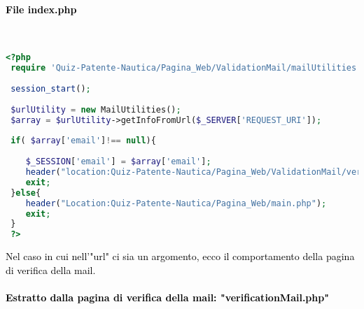 \paragraph{\textcolor{black}{File index.php}}\leavevmode\\
  
 \begin{lstlisting}[language=php]
 <?php
 require 'Quiz-Patente-Nautica/Pagina_Web/ValidationMail/mailUtilities.php';
 
 session_start();
 
 $urlUtility = new MailUtilities();
 $array = $urlUtility->getInfoFromUrl($_SERVER['REQUEST_URI']);
 
 if( $array['email']!== null){	
 	
 	$_SESSION['email'] = $array['email'];
 	header("location:Quiz-Patente-Nautica/Pagina_Web/ValidationMail/verificationMail.php");
 	exit;
 }else{
 	header("Location:Quiz-Patente-Nautica/Pagina_Web/main.php");
 	exit;
 }
 ?>
 \end{lstlisting}
 
 \textcolor{black}{Nel caso in cui nell'"url" ci sia un argomento, ecco il comportamento della pagina di verifica della mail.}\\
 
\paragraph{\textcolor{black}{Estratto dalla pagina di verifica della mail: "verificationMail.php"}}\leavevmode\\
 
